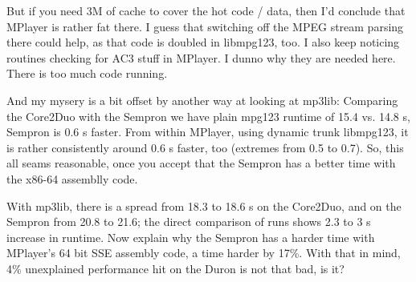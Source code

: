 \documentclass[a4paper,12pt]{scrartcl}
\begin{document}
But if you need 3M of cache to cover the hot code / data, then I'd conclude that MPlayer is rather fat there. I guess that switching off the MPEG stream parsing there could help, as that code is doubled in libmpg123, too.
I also keep noticing routines checking for AC3 stuff in MPlayer. I dunno why they are needed here. There is too much code running.

And my mysery is a bit offset by another way at looking at mp3lib: Comparing the Core2Duo with the Sempron we have plain mpg123 runtime of 15.4 vs. 14.8 s, Sempron is 0.6 s faster. From within MPlayer, using dynamic trunk libmpg123, it is rather consistently around 0.6 s faster, too (extremes from 0.5 to 0.7).
So, this all seams reasonable, once you accept that the Sempron has a better time with the x86-64 assemblly code.

With mp3lib, there is a spread from 18.3 to 18.6 s on the Core2Duo, and on the Sempron from 20.8 to 21.6; the direct comparison of runs shows 2.3 to 3 s increase in runtime. Now explain why the Sempron has a harder time with MPlayer's 64 bit SSE assembly code, a time harder by 17\%.
With that in mind, 4\% unexplained performance hit on the Duron is not that bad, is it?
\end{document}
